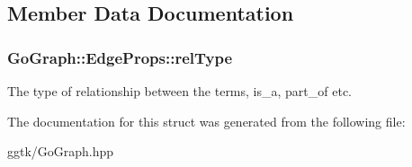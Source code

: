 \subsection{Member Data Documentation}
\subsubsection[{\texorpdfstring{rel\+Type}{relType}}]{ Go\+Graph\+::\+Edge\+Props\+::rel\+Type}\hypertarget{structGoGraph_1_1EdgeProps_af9336fa93d326a88970e8dafa64fa85e}{}\label{structGoGraph_1_1EdgeProps_af9336fa93d326a88970e8dafa64fa85e}
The type of relationship between the terms, is\+\_\+a, part\+\_\+of etc. 

The documentation for this struct was generated from the following file\+:\begin{DoxyCompactItemize}
\item 
ggtk/Go\+Graph.\+hpp\end{DoxyCompactItemize}
